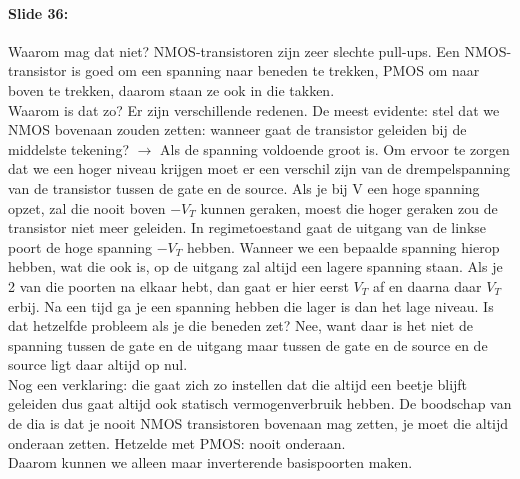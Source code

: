 \documentclass[10pt,a4paper]{book}
\begin{document}
\paragraph{Slide 36:} Waarom mag dat niet? NMOS-transistoren zijn zeer slechte pull-ups. Een NMOS-transistor is goed om een spanning naar beneden te trekken, PMOS om naar boven te trekken, daarom staan ze ook in die takken.\\
Waarom is dat zo? Er zijn verschillende redenen. De meest evidente: stel dat we NMOS bovenaan zouden zetten: wanneer gaat de transistor geleiden bij de middelste tekening? $\rightarrow$ Als de spanning voldoende groot is. Om ervoor te zorgen dat we een hoger niveau krijgen moet er een verschil zijn van de drempelspanning van de transistor tussen de gate en de source. Als je bij V een hoge spanning opzet, zal die nooit boven $-V_T$ kunnen geraken, moest die hoger geraken zou de transistor niet meer geleiden. In regimetoestand gaat de uitgang van de linkse poort de hoge spanning $-V_T$ hebben. Wanneer we een bepaalde spanning hierop hebben, wat die ook is, op de uitgang zal altijd een lagere spanning staan. Als je 2 van die poorten na elkaar hebt, dan gaat er hier eerst $V_T$ af en daarna daar $V_T$ erbij. Na een tijd ga je een spanning hebben die lager is dan het lage niveau. Is dat hetzelfde probleem als je die beneden zet? Nee, want daar is het niet de spanning tussen de gate en de uitgang maar tussen de gate en de source en de source ligt daar altijd op nul. \\
Nog een verklaring: die gaat zich zo instellen dat die altijd een beetje blijft geleiden dus gaat altijd ook statisch vermogenverbruik hebben. De boodschap van de dia is dat je nooit NMOS transistoren bovenaan mag zetten, je moet die altijd onderaan zetten. Hetzelde met PMOS: nooit onderaan.\\
Daarom kunnen we alleen maar inverterende basispoorten maken.
\end{document}
